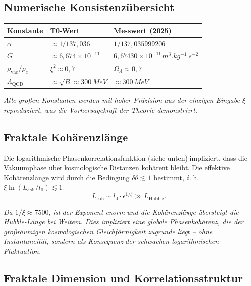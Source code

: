 	\subsection*{Numerische Konsistenzübersicht}
	
	\begin{center}
		\begin{tabular}{p{2cm}p{3cm}p{3cm}}
			Konstante & T0-Wert & Messwert (2025) \\
			\hline
			\(\alpha\) & \(\approx 1/137{,}036\) & \(1/137{,}035999206\) \\
			\(G\) & \(\approx 6{,}674 \times 10^{-11}\) & \(6{,}67430 \times 10^{-11}\,\si{m^3.kg^{-1}.s^{-2}}\) \\
			\(\rho_{\text{vac}} / \rho_c\) & \(\xi^2 \approx 0{,}7\) & \(\Omega_\Lambda \approx 0{,}7\) \\
			\(\Lambda_{\text{QCD}}\) & \(\approx \sqrt{B} \approx 300\,\si{MeV}\) & \(\approx 300\,\si{MeV}\) \\
		\end{tabular}
	\end{center}
	
	\textit{Alle großen Konstanten werden mit hoher Präzision aus der einzigen Eingabe \(\xi\) reproduziert, was die Vorhersagekraft der Theorie demonstriert.}
	
	\subsection*{Fraktale Kohärenzlänge}
	
	Die logarithmische Phasenkorrelationsfunktion (siehe unten) impliziert, dass die Vakuumphase über kosmologische Distanzen kohärent bleibt. Die effektive Kohärenzlänge wird durch die Bedingung \(\delta\theta \lesssim 1\) bestimmt, d.\,h.\ \(\xi \ln(L_{\text{coh}}/l_0) \lesssim 1\):
	\begin{equation}
		L_{\text{coh}} \sim l_0 \cdot e^{1/\xi} \gg L_{\text{Hubble}}.
	\end{equation}
	
	\textit{Da \(1/\xi \approx 7500\), ist der Exponent enorm und die Kohärenzlänge übersteigt die Hubble-Länge bei Weitem. Dies impliziert eine globale Phasenkohärenz, die der großräumigen kosmologischen Gleichförmigkeit zugrunde liegt – ohne Instantaneität, sondern als Konsequenz der schwachen logarithmischen Fluktuation.}
	
	\subsection*{Fraktale Dimension und Korrelationsstruktur}
	

